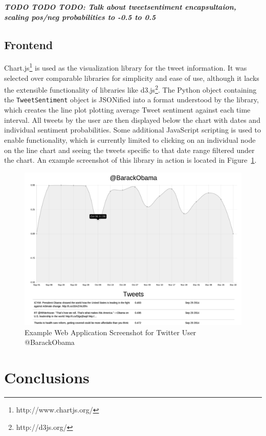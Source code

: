 \documentclass[letter,12pt]{article}
\begin{document}
\textbf{\emph{TODO TODO TODO: Talk about tweetsentiment encapsultaion, scaling pos/neg
probabilities to -0.5 to 0.5}}

\subsection{Frontend}

Chart.js\footnote{http://www.chartjs.org/} is used as the visualization library
for the tweet information. It was selected over comparable libraries for
simplicity and ease of use, although it lacks the extensible functionality of
libraries like d3.js\footnote{http://d3js.org/}. The Python object containing
the \texttt{TweetSentiment} object is JSONified into a format understood by the
library, which creates the line plot plotting average Tweet sentiment against
each time interval. All tweets by the user are then displayed below the chart
with dates and individual sentiment probabilities. Some additional JavaScript
scripting is used to enable functionality, which is currently limited to
clicking on an individual node on the line chart and seeing the tweets specific
to that date range filtered under the chart. An example screenshot of this
library in action is located in Figure~\ref{fig:obama}.

\begin{figure}[h]
  \centering
  \includegraphics[width=0.8\linewidth]{img/obama_example_usage.png}
  \caption{Example Web Application Screenshot for Twitter User @BarackObama}
  \label{fig:obama}
\end{figure}

\section{Conclusions}
\end{document}
